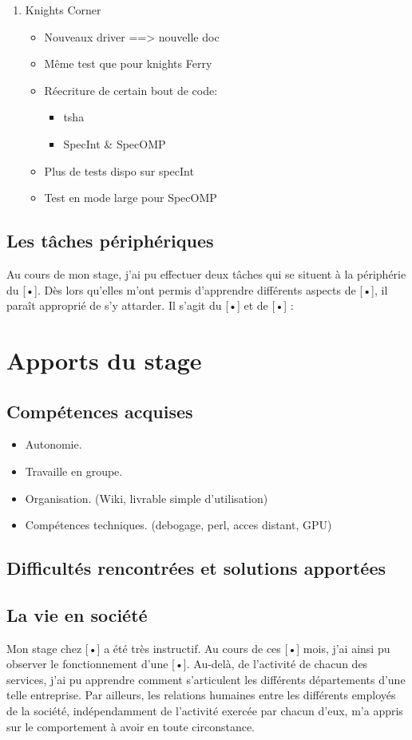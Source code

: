 \documentclass{article}
\begin{document}
\begin{enumerate}
			\item Knights Corner
				\begin{itemize}
				\item Nouveaux driver ==> nouvelle doc
				\item Même test que pour knights Ferry
				\item Réecriture de certain bout de code:
					\begin{itemize}
					\item tsha
					\item SpecInt \& SpecOMP
					\end{itemize}
				\item Plus de tests dispo sur specInt
				\item Test en mode large pour SpecOMP
				\end{itemize}
			\end{enumerate}
		\subsection{Les tâches périphériques}
			Au cours de mon stage, j’ai pu effectuer deux tâches qui se situent à la périphérie du [•]. Dès lors qu’elles 
			m’ont permis d’apprendre différents aspects de [•], il paraît approprié de s’y attarder. Il s’agit du [•] et 
			de [•] :
	\section{Apports du stage}
		\subsection{Compétences acquises}
			\begin{itemize}
			\item Autonomie.
			\item Travaille en groupe.
			\item Organisation. (Wiki, livrable simple d'utilisation)
			\item Compétences techniques. (debogage, perl, acces distant, GPU)
			\end{itemize}
		\subsection{Difficultés rencontrées et solutions apportées}
		\subsection{La vie en société}
			Mon stage chez [•] a été très instructif. Au cours de ces [•] mois, j’ai ainsi pu observer le fonctionnement 
			d’une [•]. Au-delà, de l’activité de chacun des services, j’ai pu apprendre comment s’articulent les différents 
			départements d’une telle entreprise. Par ailleurs, les relations humaines entre les différents employés de la 
			société, indépendamment de l’activité exercée par chacun d’eux, m’a appris sur le comportement à avoir en toute 
			circonstance.
\end{document}
